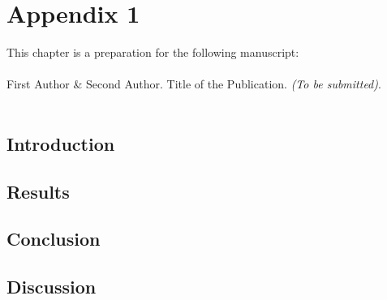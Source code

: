 \chapter{Appendix 1}

\label{appendix:appendix01}

\vspace{3cm}

This chapter is a preparation for the following manuscript:\\
\\
First Author \& 
Second Author. Title of the Publication. \textit{(To be submitted)}.\\
\\

\clearpage

\section{Introduction}
\lipsum[1-10]

\section{Results}
\lipsum[1-10]

\section{Conclusion}
\lipsum[1-10]

\section{Discussion}
\lipsum[1-10]



